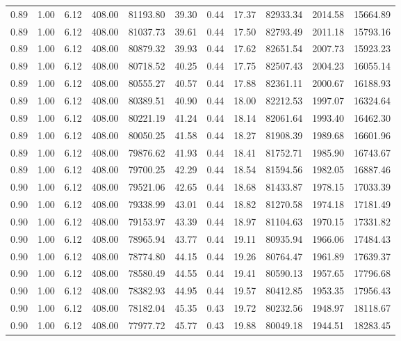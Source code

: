 \begin{table}[!ht]
\begin{tabular}{rrrrrrrrrrr}
0.89 & 1.00 & 6.12 & 408.00 & 81193.80 & 39.30 & 0.44 & 17.37 & 82933.34 & 2014.58 & 15664.89 \\
0.89 & 1.00 & 6.12 & 408.00 & 81037.73 & 39.61 & 0.44 & 17.50 & 82793.49 & 2011.18 & 15793.16 \\
0.89 & 1.00 & 6.12 & 408.00 & 80879.32 & 39.93 & 0.44 & 17.62 & 82651.54 & 2007.73 & 15923.23 \\
0.89 & 1.00 & 6.12 & 408.00 & 80718.52 & 40.25 & 0.44 & 17.75 & 82507.43 & 2004.23 & 16055.14 \\
0.89 & 1.00 & 6.12 & 408.00 & 80555.27 & 40.57 & 0.44 & 17.88 & 82361.11 & 2000.67 & 16188.93 \\
0.89 & 1.00 & 6.12 & 408.00 & 80389.51 & 40.90 & 0.44 & 18.00 & 82212.53 & 1997.07 & 16324.64 \\
0.89 & 1.00 & 6.12 & 408.00 & 80221.19 & 41.24 & 0.44 & 18.14 & 82061.64 & 1993.40 & 16462.30 \\
0.89 & 1.00 & 6.12 & 408.00 & 80050.25 & 41.58 & 0.44 & 18.27 & 81908.39 & 1989.68 & 16601.96 \\
0.89 & 1.00 & 6.12 & 408.00 & 79876.62 & 41.93 & 0.44 & 18.41 & 81752.71 & 1985.90 & 16743.67 \\
0.89 & 1.00 & 6.12 & 408.00 & 79700.25 & 42.29 & 0.44 & 18.54 & 81594.56 & 1982.05 & 16887.46 \\
0.90 & 1.00 & 6.12 & 408.00 & 79521.06 & 42.65 & 0.44 & 18.68 & 81433.87 & 1978.15 & 17033.39 \\
0.90 & 1.00 & 6.12 & 408.00 & 79338.99 & 43.01 & 0.44 & 18.82 & 81270.58 & 1974.18 & 17181.49 \\
0.90 & 1.00 & 6.12 & 408.00 & 79153.97 & 43.39 & 0.44 & 18.97 & 81104.63 & 1970.15 & 17331.82 \\
0.90 & 1.00 & 6.12 & 408.00 & 78965.94 & 43.77 & 0.44 & 19.11 & 80935.94 & 1966.06 & 17484.43 \\
0.90 & 1.00 & 6.12 & 408.00 & 78774.80 & 44.15 & 0.44 & 19.26 & 80764.47 & 1961.89 & 17639.37 \\
0.90 & 1.00 & 6.12 & 408.00 & 78580.49 & 44.55 & 0.44 & 19.41 & 80590.13 & 1957.65 & 17796.68 \\
0.90 & 1.00 & 6.12 & 408.00 & 78382.93 & 44.95 & 0.44 & 19.57 & 80412.85 & 1953.35 & 17956.43 \\
0.90 & 1.00 & 6.12 & 408.00 & 78182.04 & 45.35 & 0.43 & 19.72 & 80232.56 & 1948.97 & 18118.67 \\
0.90 & 1.00 & 6.12 & 408.00 & 77977.72 & 45.77 & 0.43 & 19.88 & 80049.18 & 1944.51 & 18283.45 \\

\end{tabular}
\end{table}
